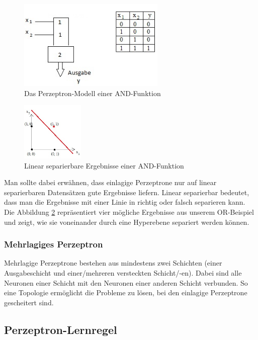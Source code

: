 \begin{figure}[h]
\centering
\includegraphics[width=7cm]{chapters/neural_networks/and.jpg}

\caption{Das Perzeptron-Modell einer AND-Funktion}
\label{orfct}

\end{figure}
\begin{figure}[h]
\centering
\includegraphics[width=3cm]{chapters/neural_networks/linearsep.jpg}

\caption{Linear separierbare Ergebnisse einer AND-Funktion}
\label{linseporfct}

\end{figure}

Man sollte dabei erwähnen, dass einlagige Perzeptrone nur auf linear separierbaren Datensätzen gute Ergebnisse liefern. Linear separierbar bedeutet, dass man die Ergebnisse mit einer Linie in richtig oder falsch separieren kann. Die Abbildung \ref{linseporfct} repräsentiert vier mögliche Ergebnisse aus unserem OR-Beispiel und zeigt, wie sie voneinander durch eine Hyperebene separiert werden können.


\subsubsection{Mehrlagiges Perzeptron}

Mehrlagige Perzeptrone bestehen aus mindestens zwei Schichten (einer Ausgabeschicht und einer/mehreren versteckten Schicht/-en). Dabei sind alle Neuronen einer Schicht mit den Neuronen einer anderen Schicht verbunden. So eine Topologie ermöglicht die Probleme zu lösen, bei den einlagige Perzeptrone gescheitert sind.

\subsection{Perzeptron-Lernregel}

